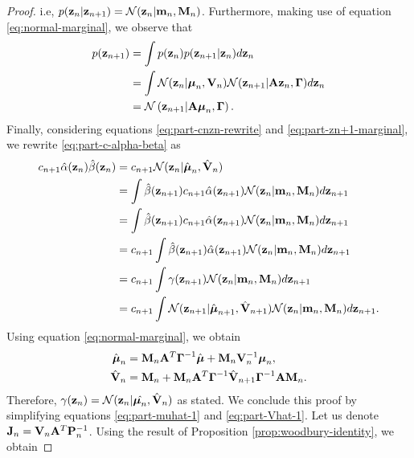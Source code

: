 \documentclass[12pt, oneside]{book}
\numberwithin{equation}{section}
\newcommand{\z}{{\bf z}}
\newcommand{\N}{\mathcal{N}}
\begin{document}
{\begin{proof}
	i.e, $p(\z_n \vert \z_{n+1}) = \N(\z_n \vert {\bf m}_n, {\bf M}_n)$. Furthermore, making use of equation \eqref{eq:normal-marginal}, we observe that
	\begin{align}
		p(\z_{n+1}) &= \int p(\z_n) p(\z_{n+1} \vert \z_n) d\z_n\\
					&= \int \N(\z_n \vert\boldsymbol\mu_n, {\bf V}_n) \N(\z_{n+1} \vert {\bf A}\z_n, \boldsymbol\Gamma) d\z_n\\
					&= \N\left(\z_{n+1} \vert {\bf A}\boldsymbol\mu_n, \boldsymbol\Gamma\right) \label{eq:part-zn+1-marginal}.
	\end{align}
	Finally, considering equations \eqref{eq:part-cnzn-rewrite} and \eqref{eq:part-zn+1-marginal}, we rewrite \eqref{eq:part-c-alpha-beta} as
	\begin{align}
		c_{n+1}\hat\alpha(\z_n)\hat\beta(\z_n) &= c_{n+1} \N(\z_{n} \vert \hat{\boldsymbol\mu}_n, \hat{\bf V}_n)\\
		&= \int \hat\beta(\z_{n+1}) c_{n+1} \hat\alpha(\z_{n+1})\N(\z_n \vert {\bf m}_n, {\bf M}_n) d\z_{n+1}\\
		&= \int \hat\beta(\z_{n+1}) c_{n+1} \hat\alpha(\z_{n+1})\N(\z_n \vert {\bf m}_n, {\bf M}_n)d\z_{n+1}\\
		&= c_{n+1}\int \hat\beta(\z_{n+1}) \hat\alpha(\z_{n+1})\N(\z_n \vert {\bf m}_n, {\bf M}_n)d\z_{n+1}\\
		&= c_{n+1}\int \gamma(\z_{n+1})\N(\z_n \vert {\bf m}_n, {\bf M}_n) d\z_{n+1}\\
		&= c_{n+1}\int \N(\z_{n+1} \vert \hat{\boldsymbol\mu}_{n+1}, \hat{\bf V}_{n+1})\N(\z_n \vert {\bf m}_n, {\bf M}_n)d\z_{n+1}.
	\end{align}
	Using equation \eqref{eq:normal-marginal}, we obtain
	\begin{align}
		\hat{\boldsymbol{\mu}}_n &= {\bf M}_n {\bf A}^T \boldsymbol\Gamma ^{-1} \hat{\boldsymbol{\mu}} + {\bf M}_n {\bf V}_n^{-1} \boldsymbol\mu_n \label{eq:part-muhat-1},\\
		\hat{{\bf V}}_n&= {\bf M}_n + {\bf M}_n {\bf A}^T \boldsymbol{\Gamma}^{-1} \hat{\bf V}_{n+1}\boldsymbol\Gamma^{-1}{\bf A}{\bf M}_n \label{eq:part-Vhat-1}.
	\end{align}
	Therefore, $\gamma(\z_n) = \N(\z_n \vert \hat{\boldsymbol{\mu}_n}, \hat {\bf V}_n)$ as stated. 
	We conclude this proof by simplifying equations \eqref{eq:part-muhat-1} and \eqref{eq:part-Vhat-1}.  Let us denote ${\bf J}_n = {\bf V}_n{\bf A}^T{\bf P}_n^{-1}$. Using the result of Proposition \ref{prop:woodbury-identity}, we obtain

\end{proof}}
\end{document}
